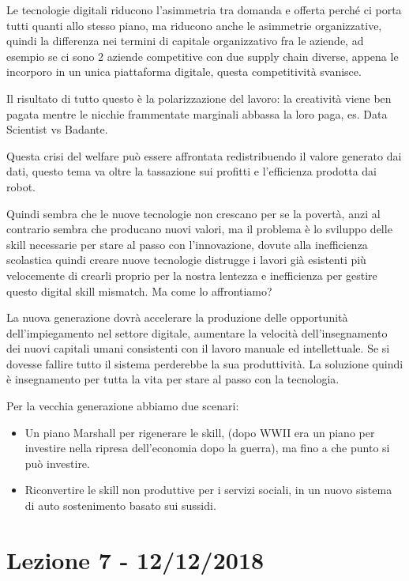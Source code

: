 \documentclass[a4page, 11pt]{article}
\begin{document}
Le tecnologie digitali riducono l'asimmetria tra domanda e offerta
perché ci porta tutti quanti allo stesso piano, ma riducono anche le
asimmetrie organizzative, quindi la differenza nei termini di capitale
organizzativo fra le aziende, ad esempio se ci sono 2 aziende
competitive con due supply chain diverse, appena le incorporo in un
unica piattaforma digitale, questa competitività svanisce.

Il risultato di tutto questo è la polarizzazione del lavoro: la
creatività viene ben pagata mentre le nicchie frammentate marginali
abbassa la loro paga, es. Data Scientist vs Badante.

Questa crisi del welfare può essere affrontata redistribuendo il valore
generato dai dati, questo tema va oltre la tassazione sui profitti e
l'efficienza prodotta dai robot.

Quindi sembra che le nuove tecnologie non crescano per se la povertà,
anzi al contrario sembra che producano nuovi valori, ma il problema è lo
sviluppo delle skill necessarie per stare al passo con l'innovazione,
dovute alla inefficienza scolastica quindi creare nuove tecnologie
distrugge i lavori già esistenti più velocemente di crearli proprio per
la nostra lentezza e inefficienza per gestire questo digital skill
mismatch. Ma come lo affrontiamo?

La nuova generazione dovrà accelerare la produzione delle opportunità
dell'impiegamento nel settore digitale, aumentare la velocità
dell'insegnamento dei nuovi capitali umani consistenti con il lavoro
manuale ed intellettuale. Se si dovesse fallire tutto il sistema
perderebbe la sua produttività. La soluzione quindi è insegnamento per
tutta la vita per stare al passo con la tecnologia.

Per la vecchia generazione abbiamo due scenari:

\begin{itemize}
	 
	\item
	Un piano Marshall per rigenerare le skill, (dopo WWII era un piano per
	investire nella ripresa dell'economia dopo la guerra), ma fino a che
	punto si può investire.
	\item
	Riconvertire le skill non produttive per i servizi sociali, in un
	nuovo sistema di auto sostenimento basato sui sussidi.
\end{itemize}
\section*{Lezione 7 - 12/12/2018}
\end{document}
